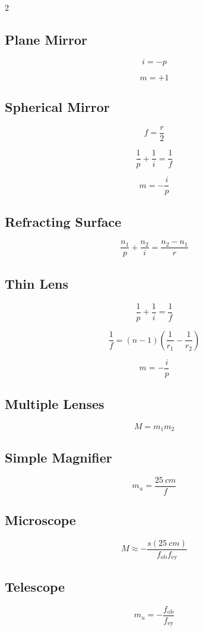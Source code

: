 \documentclass{studentnotes}
\begin{document}
\begin{multicols}{2}

\subsection*{Plane Mirror}

\[
    i=-p
\]

\[
    m=+1
\]

\subsection*{Spherical Mirror}

\[
    f=\frac{r}{2}
\]

\[
    \frac{1}{p}+\frac{1}{i}=\frac{1}{f}
\]

\[
    m=-\frac{i}{p}
\]

\subsection*{Refracting Surface}

\[
    \frac{n_1}{p}+\frac{n_2}{i}
    =
    \frac{n_2-n_1}{r}
\]

\subsection*{Thin Lens}

\[
    \frac{1}{p}+\frac{1}{i}=\frac{1}{f}
\]

\[
    \frac{1}{f}
    =
    (n-1)
    \left(
        \frac{1}{r_1}
        -
        \frac{1}{r_2}
    \right)
\]

\[
    m=-\frac{i}{p}
\]

\subsection*{Multiple Lenses}

\[
    M=m_1m_2
\]

\subsection*{Simple Magnifier}

\[
    m_u=\frac{\SI{25}{cm}}{f}
\]

\subsection*{Microscope}

\[
    M\approx
    -
    \frac{s(\SI{25}{cm})}
    {f_{\text{ob}}f_{\text{ey}}}
\]

\subsection*{Telescope}

\[
    m_u=-\frac{f_{\text{ob}}}{f_{\text{ey}}}
\]

\end{multicols}
\end{document}
